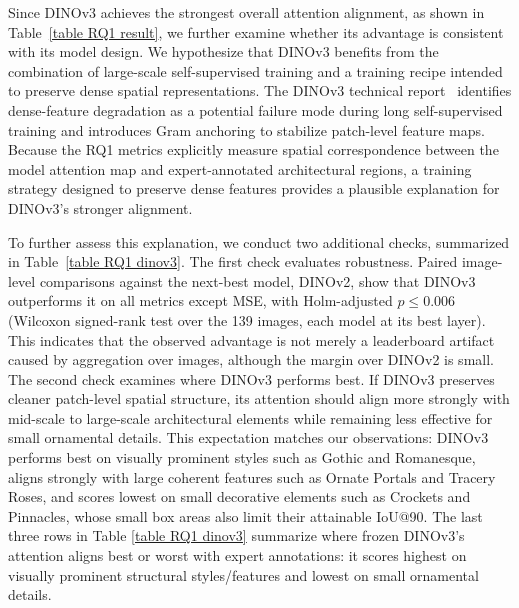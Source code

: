 \documentclass[lineno,pdflatex,sn-mathphys-num]{sn-jnl}%
\theoremstyle{thmstyleone}%
\theoremstyle{thmstyletwo}%
\theoremstyle{thmstylethree}%
\begin{document}
Since DINOv3 achieves the strongest overall attention alignment, as shown in Table~\ref{table RQ1 result}, we further examine whether its advantage is consistent with its model design. We hypothesize that DINOv3 benefits from the combination of large-scale self-supervised training and a training recipe intended to preserve dense spatial representations. The DINOv3 technical report~\cite{Simeoni26DINOv3} identifies dense-feature degradation as a potential failure mode during long self-supervised training and introduces Gram anchoring to stabilize patch-level feature maps. Because the RQ1 metrics explicitly measure spatial correspondence between the model attention map and expert-annotated architectural regions, a training strategy designed to preserve dense features provides a plausible explanation for DINOv3's stronger alignment.

To further assess this explanation, we conduct two additional checks, summarized in Table~\ref{table RQ1 dinov3}. The first check evaluates robustness. Paired image-level comparisons against the next-best model, DINOv2, show that DINOv3 outperforms it on all metrics except MSE, with Holm-adjusted $p \le 0.006$ (Wilcoxon signed-rank test over the 139 images, each model at its best layer). This indicates that the observed advantage is not merely a leaderboard artifact caused by aggregation over images, although the margin over DINOv2 is small. The second check examines where DINOv3 performs best. If DINOv3 preserves cleaner patch-level spatial structure, its attention should align more strongly with mid-scale to large-scale architectural elements while remaining less effective for small ornamental details. This expectation matches our observations: DINOv3 performs best on visually prominent styles such as Gothic and Romanesque, aligns strongly with large coherent features such as Ornate Portals and Tracery Roses, and scores lowest on small decorative elements such as Crockets and Pinnacles, whose small box areas also limit their attainable IoU@90. The last three rows in Table \ref{table RQ1 dinov3} summarize where frozen DINOv3’s attention aligns best or worst with expert annotations: it scores highest on visually prominent structural styles/features and lowest on small ornamental details.
\end{document}
